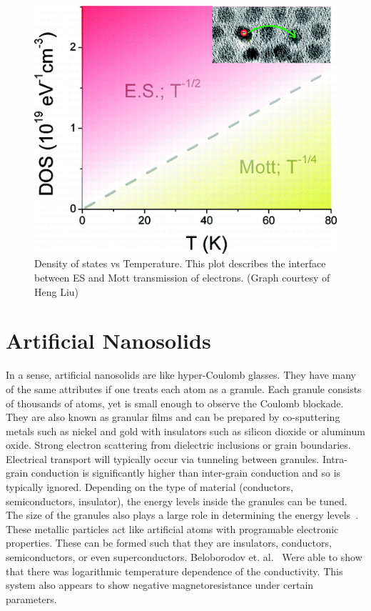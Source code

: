 \begin{figure}[htbp]
\begin{center}
\includegraphics[scale=.50]{MottvsES.png}
\caption{Density of states vs Temperature. This plot describes the interface between ES and Mott transmission of electrons. (Graph courtesy of Heng Liu)}
\label{MvsES}
\end{center}
\end{figure}


\section{Artificial Nanosolids}

In a sense, artificial nanosolids are like hyper-Coulomb glasses. They have many of the same attributes if one treats each atom as a granule. Each granule consists of thousands of atoms, yet is small enough to observe the Coulomb blockade. They are also known as granular films and can be prepared by co-sputtering metals such as nickel and gold with insulators such as silicon dioxide or aluminum oxide. Strong electron scattering from dielectric inclusions or grain boundaries. Electrical transport will typically occur via tunneling between granules. Intra-grain conduction is significantly higher than inter-grain conduction and so is typically ignored. Depending on the type of material (conductors, semiconductors, insulator), the energy levels inside the granules can be tuned. The size of the granules also plays a large role in determining the energy levels~\cite{Abeles75}.  These metallic particles act like artificial atoms with programable electronic properties. These can be formed such that they are insulators, conductors, semiconductors, or even superconductors. Beloborodov et. al.~\cite{Beloborodov07}  Were able to show that there was logarithmic temperature dependence of the conductivity. This system also appears to show negative magnetoresistance under certain parameters. 

